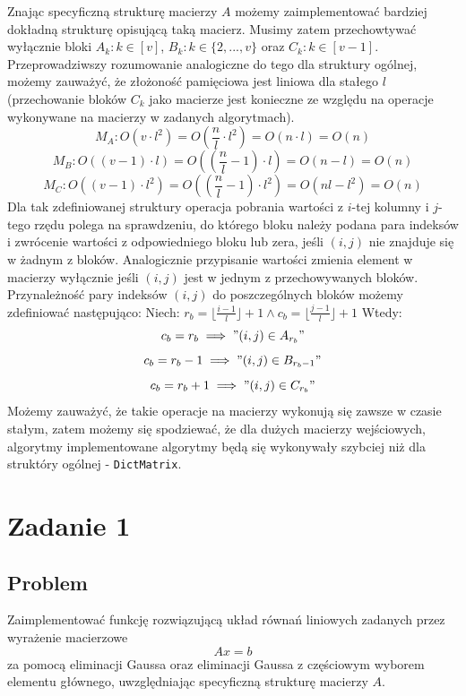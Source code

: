 \documentclass[11pt]{article}
\begin{document}
        \noindent
        Znając specyficzną strukturę macierzy $A$ możemy zaimplementować bardziej dokładną strukturę opisującą taką macierz. Musimy zatem przechowtywać wyłącznie bloki $A_k : k \in [v]$, $B_k : k \in \{2, ..., v\}$ oraz $C_k : k \in [v - 1]$. Przeprowadziwszy rozumowanie analogiczne do tego dla struktury ogólnej, możemy zauważyć, że złożoność pamięciowa jest liniowa dla stałego $l$ (przechowanie bloków $C_k$ jako macierze jest konieczne ze względu na operacje wykonywane na macierzy w zadanych algorytmach).
        $$ M_A : O(v \cdot l^2) = O(\frac{n}{l} \cdot l^2) = O(n \cdot l) = O(n) $$
        $$ M_B : O((v - 1) \cdot l) = O((\frac{n}{l} - 1) \cdot l) = O(n - l) = O(n) $$
        $$ M_C : O((v - 1) \cdot l^2) = O((\frac{n}{l} - 1) \cdot l^2) = O(nl - l^2) = O(n) $$
        \noindent
        Dla tak zdefiniowanej struktury operacja pobrania wartości z $i$-tej kolumny i $j$-tego rzędu polega na sprawdzeniu, do którego bloku należy podana para indeksów i zwrócenie wartości z odpowiedniego bloku lub zera, jeśli $(i, j)$ nie znajduje się w żadnym z bloków. Analogicznie przypisanie wartości zmienia element w macierzy wyłącznie jeśli $(i, j)$ jest w jednym z przechowywanych bloków.
        \newline
        Przynależność pary indeksów $(i, j)$ do poszczególnych bloków możemy zdefiniować następująco:
        \newline\newline
        Niech: $ r_b = \lfloor \frac{i - 1}{l} \rfloor + 1 \land c_b = \lfloor \frac{j - 1}{l} \rfloor + 1 $
        \newline
        Wtedy:
        $$ c_b = r_b \implies "(i, j) \in A_{r_b}" $$
        $$ c_b = r_b - 1 \implies "(i, j) \in B_{r_b - 1}" $$
        $$ c_b = r_b + 1 \implies "(i, j) \in C_{r_b}" $$
        \newline
        Możemy zauważyć, że takie operacje na macierzy wykonują się zawsze w czasie stałym, zatem możemy się spodziewać, że dla dużych macierzy wejściowych, algorytmy implementowane algorytmy będą się wykonywały szybciej niż dla struktóry ogólnej - \texttt{DictMatrix}.

    \newpage

\section*{Zadanie 1}
    \subsection*{Problem}
        Zaimplementować funkcję rozwiązującą układ równań liniowych zadanych przez wyrażenie macierzowe
        $$ Ax = b $$
        za pomocą eliminacji Gaussa oraz eliminacji Gaussa z częściowym wyborem elementu głównego, uwzględniając specyficzną strukturę macierzy $A$.
\end{document}
